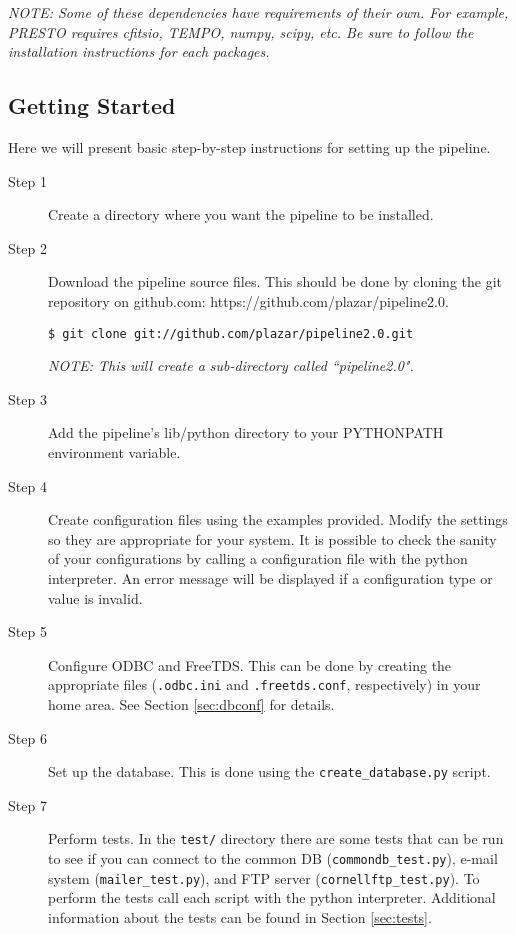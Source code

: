 \textit{NOTE: Some of these dependencies have requirements of their own. For example, PRESTO requires cfitsio, TEMPO, numpy, scipy, etc. Be sure to follow the installation instructions for each packages.}

\subsection{Getting Started}
Here we will present basic step-by-step instructions for setting up the pipeline.

\begin{description}
    \item[Step 1] Create a directory where you want the pipeline to be installed.

    \item[Step 2] Download the pipeline source files. This should be done by cloning the git repository on github.com: https://github.com/plazar/pipeline2.0.

        \smallskip

        \texttt{\$ git clone git://github.com/plazar/pipeline2.0.git}

        \smallskip
        
        \textit{NOTE: This will create a sub-directory called ``pipeline2.0".} 

    \item[Step 3] Add the pipeline's lib/python directory to your PYTHONPATH environment variable. 

    \item[Step 4] Create configuration files using the examples provided. Modify the settings so they are appropriate for your system. It is possible to check the sanity of your configurations by calling a configuration file with the python interpreter. An error message will be displayed if a configuration type or value is invalid.  

    \item[Step 5] Configure ODBC and FreeTDS. This can be done by creating the appropriate files (\texttt{.odbc.ini} and \texttt{.freetds.conf}, respectively) in your home area. See Section \ref{sec:dbconf} for details.

    \item[Step 6] Set up the database. This is done using the \texttt{create\_database.py} script.

    \item[Step 7] Perform tests. In the \texttt{test/} directory there are some tests that can be run to see if you can connect to the common DB (\texttt{commondb\_test.py}), e-mail system (\texttt{mailer\_test.py}), and FTP server (\texttt{cornellftp\_test.py}). To perform the tests call each script with the python interpreter. Additional information about the tests can be found in Section \ref{sec:tests}.


\end{description}
